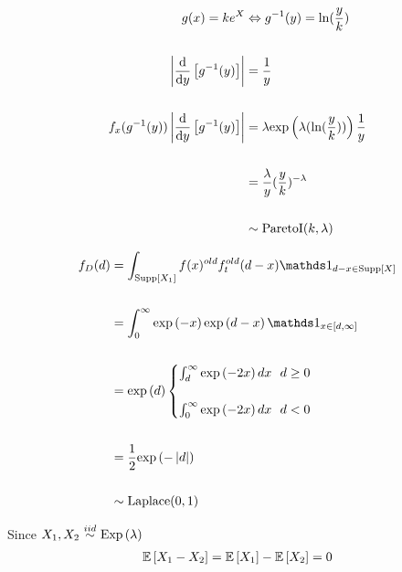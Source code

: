 \documentclass[12pt]{article}
\begin{document}
\begin{enumerate}
\begin{align*}
    g(x) = ke^{X}  &\Leftrightarrow  g^{-1}(y) =  \ln(\frac{y}{k})\\ \\
    \left|\dfrac{\text{d}}{\text{d} y}\left[g^{-1}(y)\right]\right| &= \frac{1}{y} \\ \\ 
    f_x(g^{-1}(y)) \left|\dfrac{\text{d}}{\text{d} y}\left[g^{-1}(y)\right]\right| &= \lambda \mathrm{exp}\left(\lambda (\ln(\frac{y}{k}))\right) \frac{1}{y} \\ \\ 
    &= \frac{\lambda}{y} (\frac{y}{k})^{-\lambda} \\ \\ 
    &\sim \text{ParetoI}(k, \lambda)
\end{align*}


\begin{align*}
    f_D(d) &= \int_{\support{X_1}} f(x)^{old} f_t^{old}(d-x) \indic{d-x \in \support{X}} \\ \\ 
    &= \int_0^\infty \exp{-x} \exp{d-x} \indic{x \in [d, \infty]} \\ \\ 
    &= \exp{d} 
    \begin{cases}
        \int_d^\infty \exp{-2x} dx ~~d \geq 0 \\ \\ 
        \int_0^\infty \exp{-2x} dx ~~d < 0
    \end{cases} \\ \\ 
    &= \frac{1}{2} \exp{-\abss{d}} \\ \\ 
    &\sim \text{Laplace}(0, 1)
\end{align*}


Since $X_1, X_2 \iid \exponential{\lambda}$
\begin{align*}
    \mathbb{E}\left[X_1 - X_2\right] = \mathbb{E}\left[X_1\right] - \mathbb{E}\left[X_2\right] = 0
\end{align*}



\end{enumerate}
\end{document}
